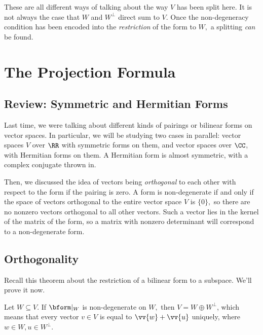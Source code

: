 These are all different ways of talking about the way $V$ has been split here. It is not always the case that $W$ and $W^{\perp}$ direct sum to $V.$ Once the non-degeneracy condition has been encoded into the \emph{restriction} of the form to $W,$ a splitting \emph{can} be found.

\newpage


\section{The Projection Formula}
\subsection{Review: Symmetric and Hermitian Forms}
Last time, we were talking about different kinds of pairings or bilinear forms on vector spaces. In particular, we will be studying two cases in parallel: vector spaces $V$ over $\RR$ with symmetric forms on them, and vector spaces over $\CC$, with Hermitian forms on them. A Hermitian form is almost symmetric, with a complex conjugate thrown in.

Then, we discussed the idea of vectors being \emph{orthogonal} to each other with respect to the form if the pairing is zero. A form is non-degenerate if and only if the space of vectors orthogonal to the entire vector space $V$ is $\{0\},$ so there are no nonzero vectors orthogonal to all other vectors. Such a vector lies in the kernel of the matrix of the form, so a matrix with nonzero determinant will correspond to a non-degenerate form. 


\subsection{Orthogonality}

Recall this theorem about the restriction of a bilinear form to a subspace. We'll prove it now.
\begin{theorem}\label{non-degenerate stuff}
Let $W \subseteq V.$ If $\bform|_W$ is non-degenerate on $W,$ then $V = W \oplus W^{\perp}$, which means that every vector $v \in V$ is equal to $\vv{w} + \vv{u}$ uniquely, where $w \in W, u \in W^\perp$. 
\end{theorem}

